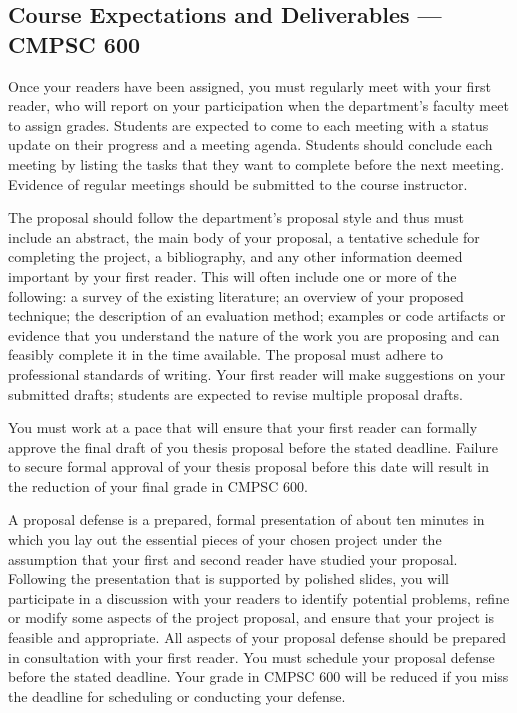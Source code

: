 \subsection*{Course Expectations and Deliverables --- CMPSC 600}

\medskip
{} Once your readers have been assigned, you must regularly meet with your first reader, who
will report on your participation when the department's faculty meet to assign grades.  Students are expected to come to
each meeting with a status update on their progress and a meeting agenda.  Students should conclude each meeting by
listing the tasks that they want to complete before the next meeting. Evidence of regular meetings should be submitted
to the course instructor. 

\medskip
{}
The proposal should follow the department's proposal style and thus must include an abstract, the main body of your
proposal, a tentative schedule for completing the project, a bibliography, and any other information deemed important by
your first reader. This will often include one or more of the following: a survey of the existing literature; an overview of
your proposed technique; the description of an evaluation method; examples or code artifacts or evidence that you
understand the nature of the work you are proposing and can feasibly complete it in the time available. 
The proposal must adhere to professional standards of writing. Your first reader will make suggestions on your submitted
drafts; students are expected to revise multiple proposal drafts.

% 
% 

You must work at a pace that will ensure that your first reader can formally approve the final draft of you thesis
proposal before the stated deadline.  Failure to secure formal approval of your thesis proposal before this date will
result in the reduction of your final grade in CMPSC 600.


\medskip
{}
A proposal defense is a prepared, formal presentation of about ten minutes in which you lay out the essential pieces of
your chosen project under the assumption that your first and second reader have studied your proposal.  Following the
presentation that is supported by polished slides, you will participate in a discussion with your readers to identify
potential problems, refine or modify some aspects of the project proposal, and ensure that your project is feasible
and appropriate. All aspects of your proposal defense should be prepared in consultation with your first reader.
You must schedule your proposal defense before the stated deadline. Your grade in CMPSC 600 will be reduced if you miss the
deadline for scheduling or conducting your defense.

